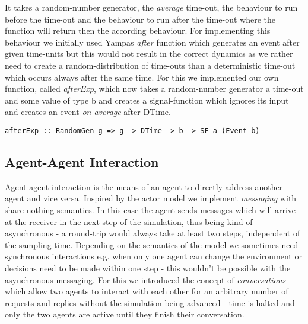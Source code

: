 It takes a random-number generator, the \textit{average} time-out, the behaviour to run before the time-out and the behaviour to run after the time-out where the function will return then the according behaviour. For implementing this behaviour we initially used Yampas \textit{after} function which generates an event after given time-units but this would not result in the correct dynamics as we rather need to create a random-distribution of time-outs than a deterministic time-out which occurs always after the same time. For this we implemented our own function, called \textit{afterExp}, which now takes a random-number generator a time-out and some value of type b and creates a signal-function which ignores its input and creates an event \textit{on average} after DTime.

\begin{verbatim}
afterExp :: RandomGen g => g -> DTime -> b -> SF a (Event b)
\end{verbatim}

\subsection{Agent-Agent Interaction}
Agent-agent interaction is the means of an agent to directly address another agent and vice versa. Inspired by the actor model we implement  \textit{messaging} with share-nothing semantics. In this case the agent sends messages which will arrive at the receiver in the next step of the simulation, thus being kind of asynchronous - a round-trip would always take at least two steps, independent of the sampling time. Depending on the semantics of the model we sometimes need synchronous interactions e.g. when only one agent can change the environment or decisions need to be made within one step - this wouldn't be possible with the asynchronous messaging. For this we introduced the concept of \textit{conversations} which allow two agents to interact with each other for an arbitrary number of requests and replies without the simulation being advanced - time is halted and only the two agents are active until they finish their conversation.

